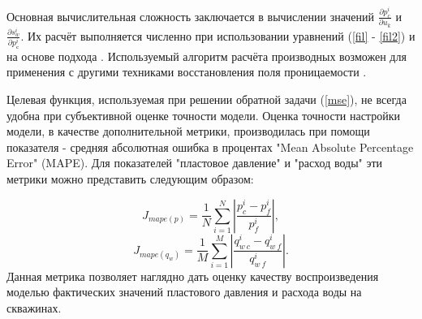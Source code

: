 \documentclass{article}
\begin{document}
Основная вычислительная сложность заключается в вычислении значений $\frac{\partial p_c^i}{\partial u_k}$ и $\frac{\partial s_w^i}{\partial p_с^i}$. Их расчёт выполняется численно при использовании уравнений (\ref{fil} - \ref{fil2}) и на основе подхода \cite{opt}. Используемый алгоритм расчёта производных возможен для применения с другими техниками восстановления поля проницаемости \cite{leg}.

Целевая функция, используемая при решении обратной задачи ({\ref{mse}}), не всегда удобна при субъективной оценке точности модели. Оценка точности настройки модели, в качестве дополнительной метрики, производилась при помощи показателя - средняя абсолютная ошибка в процентах "Mean Absolute Percentage Error" (MAPE). Для показателей "пластовое давление" и  "расход воды" эти метрики можно представить следующим образом:

\begin{equation*} \label{mape_p}
 	J_{mape(p)}=\frac{1}{N}\sum_{i=1}^N{\left|\frac{p_c^i-p_f^i}{p_f^i}\right|},
\end{equation*}
\begin{equation*} \label{mape_qo}
 	J_{mape(q_w)}=\frac{1}{M}\sum_{i=1}^M{\left|\frac{q_{w\:c}^i-q_{w\:f}^i}{q_{w\:f}^i}\right|}.
\end{equation*}
Данная метрика позволяет наглядно дать оценку качеству воспроизведения моделью фактических значений пластового давления и расхода воды на скважинах.
\end{document}

